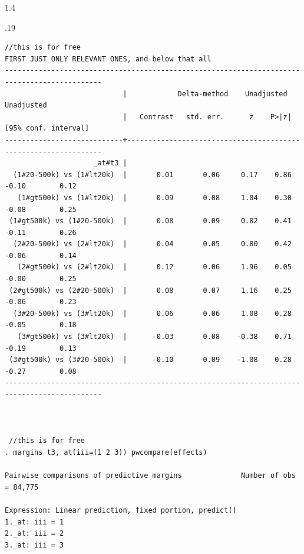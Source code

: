 \documentclass[10pt, letterpaper]{article}
\begin{document}
\begin{spacing}{1.4}
\begin{scriptsize}
\begin{spacing}{.19} 
\begin{verbatim}
//this is for free
FIRST JUST ONLY RELEVANT ONES, and below that all
---------------------------------------------------------------------------------------------
                            |            Delta-method    Unadjusted           Unadjusted
                            |   Contrast   std. err.      z    P>|z|     [95% conf. interval]
----------------------------+----------------------------------------------------------------
                     _at#t3 |
  (1#20-500k) vs (1#lt20k)  |       0.01       0.06     0.17    0.86        -0.10        0.12
   (1#gt500k) vs (1#lt20k)  |       0.09       0.08     1.04    0.30        -0.08        0.25
 (1#gt500k) vs (1#20-500k)  |       0.08       0.09     0.82    0.41        -0.11        0.26
  (2#20-500k) vs (2#lt20k)  |       0.04       0.05     0.80    0.42        -0.06        0.14
   (2#gt500k) vs (2#lt20k)  |       0.12       0.06     1.96    0.05        -0.00        0.25
 (2#gt500k) vs (2#20-500k)  |       0.08       0.07     1.16    0.25        -0.06        0.23
  (3#20-500k) vs (3#lt20k)  |       0.06       0.06     1.08    0.28        -0.05        0.18
   (3#gt500k) vs (3#lt20k)  |      -0.03       0.08    -0.38    0.71        -0.19        0.13
 (3#gt500k) vs (3#20-500k)  |      -0.10       0.09    -1.08    0.28        -0.27        0.08
---------------------------------------------------------------------------------------------



 //this is for free
. margins t3, at(iii=(1 2 3)) pwcompare(effects)

Pairwise comparisons of predictive margins              Number of obs = 84,775

Expression: Linear prediction, fixed portion, predict()
1._at: iii = 1
2._at: iii = 2
3._at: iii = 3


\end{verbatim}
\end{spacing}
\end{scriptsize}
\end{spacing}
\end{document}
